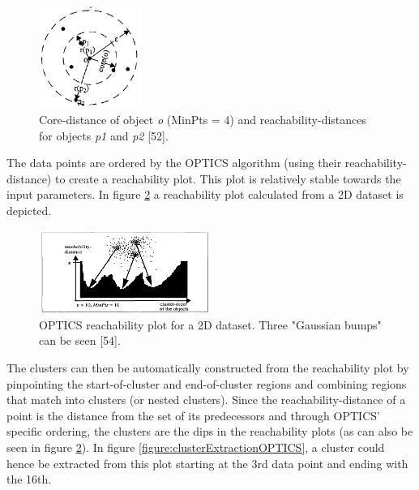\begin{figure}[h]
  \centering
  \includegraphics[width=0.3\textwidth]{./images/reachabilityDistanceOPTICS.png}
  \caption{Core-distance of object \textit{o} (MinPts = 4) and reachability-distances for objects \textit{p1} and \textit{p2} \autocite{OPTICS}[52].}
  \label{figure:reachabilityDistanceOPTICS}
\end{figure}

The data points are ordered by the OPTICS algorithm (using their reachability-distance) to create a reachability plot. This plot is relatively stable towards the input parameters. In figure \ref{figure:reachabilityPlotOPTICS} a reachability plot calculated from a 2D dataset is depicted. 

\begin{figure}[h]
  \centering
  \includegraphics[width=0.5\textwidth]{./images/reachabilityPlotOPTICS.png}
  \caption{OPTICS reachability plot for a 2D dataset. Three "Gaussian bumps" can be seen \autocite{OPTICS}[54].}
  \label{figure:reachabilityPlotOPTICS}
\end{figure}

The clusters can then be automatically constructed from the reachability plot by pinpointing the start-of-cluster and end-of-cluster regions and combining regions that match into clusters (or nested clusters). Since the reachability-distance of a point is the distance from the set of its predecessors and through OPTICS' specific ordering, the clusters are the dips in the reachability plots (as can also be seen in figure \ref{figure:reachabilityPlotOPTICS}). In figure \ref{figure:clusterExtractionOPTICS}, a cluster could hence be extracted from this plot starting at the 3rd data point and ending with the 16th.


